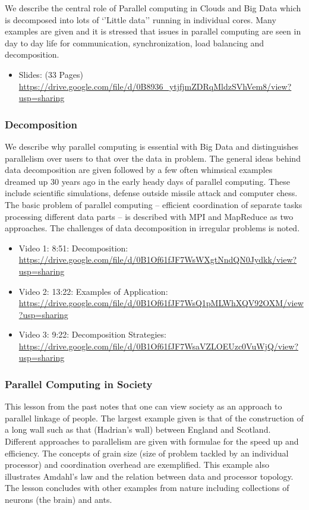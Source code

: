 We describe the central role of Parallel computing in Clouds and Big
Data which is decomposed into lots of `'Little data'' running in
individual cores. Many examples are given and it is stressed that issues
in parallel computing are seen in day to day life for communication,
synchronization, load balancing and decomposition.

\begin{itemize}
\tightlist
\item
  Slides: (33 Pages)
  \url{https://drive.google.com/file/d/0B8936_ytjfjmZDRqMldzSVhVem8/view?usp=sharing}
\end{itemize}

\subsubsection{Decomposition}\label{decomposition}

We describe why parallel computing is essential with Big Data and
distinguishes parallelism over users to that over the data in problem.
The general ideas behind data decomposition are given followed by a few
often whimsical examples dreamed up 30 years ago in the early heady days
of parallel computing. These include scientific simulations, defense
outside missile attack and computer chess. The basic problem of parallel
computing -- efficient coordination of separate tasks processing
different data parts -- is described with MPI and MapReduce as two
approaches. The challenges of data decomposition in irregular problems
is noted.

\begin{itemize}
\tightlist
\item
  Video 1: 8:51: Decomposition:
  \url{https://drive.google.com/file/d/0B1Of61fJF7WsWXgtNndQN0Jydkk/view?usp=sharing}
\item
  Video 2: 13:22: Examples of Application:
  \url{https://drive.google.com/file/d/0B1Of61fJF7WsQ1pMLWhXQV92OXM/view?usp=sharing}
\item
  Video 3: 9:22: Decomposition Strategies:
  \url{https://drive.google.com/file/d/0B1Of61fJF7WsaVZLOEUzc0VuWjQ/view?usp=sharing}
\end{itemize}

\subsubsection{Parallel Computing in
Society}\label{parallel-computing-in-society}

This lesson from the past notes that one can view society as an approach
to parallel linkage of people. The largest example given is that of the
construction of a long wall such as that (Hadrian's wall) between
England and Scotland. Different approaches to parallelism are given with
formulae for the speed up and efficiency. The concepts of grain size
(size of problem tackled by an individual processor) and coordination
overhead are exemplified. This example also illustrates Amdahl's law and
the relation between data and processor topology. The lesson concludes
with other examples from nature including collections of neurons (the
brain) and ants.

